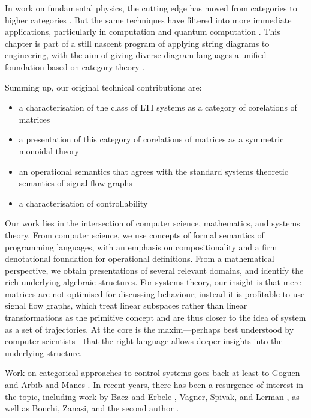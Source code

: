 In work on fundamental physics, the cutting edge has moved from categories
to higher categories \cite{BL}.  But the same techniques have filtered into more
immediate applications, particularly in computation and quantum computation
\cite{AC04,Ba1,Sel07}.  This chapter is part of a still nascent program of
applying string diagrams to engineering, with the aim of giving diverse diagram
languages a unified foundation based on category theory \cite{BE,BSZ,KSW,RSW05,Sp}. 



\smallskip
Summing up, our original technical contributions are:
\begin{itemize}
\item a characterisation of the class of LTI systems as a category of corelations of matrices
\item a presentation of this category of corelations of matrices as a symmetric
  monoidal theory
\item an operational semantics that agrees with the standard systems theoretic
semantics of signal flow graphs
\item a characterisation of controllability
\end{itemize}

\smallskip

Our work lies in the intersection of computer science, mathematics, and systems
theory.  From computer science, we use concepts  of formal semantics of
programming languages, with an emphasis on compositionality and a firm
denotational foundation for operational definitions.  From a mathematical
perspective, we obtain presentations of several relevant domains, and identify
the rich underlying algebraic structures.  For systems theory, our insight is
that mere matrices are not optimised for discussing behaviour; instead it is
profitable to use signal flow graphs, which treat linear subspaces rather than
linear transformations as the primitive concept and are thus closer to the idea
of system as a set of trajectories. At the core is the maxim---perhaps best
understood by computer scientists---that the right language allows deeper
insights into the underlying structure.

Work on categorical approaches to control systems goes back at least to Goguen
\cite{Go} and Arbib and Manes \cite{AM}. In recent years, there has been a
resurgence of interest in the topic, including work by Baez and Erbele
\cite{BE}, Vagner, Spivak, and Lerman \cite{VSL}, as well as Bonchi, Zanasi, and
the second author \cite{BSZ1,BSZ2,BSZ3,Za}. 
